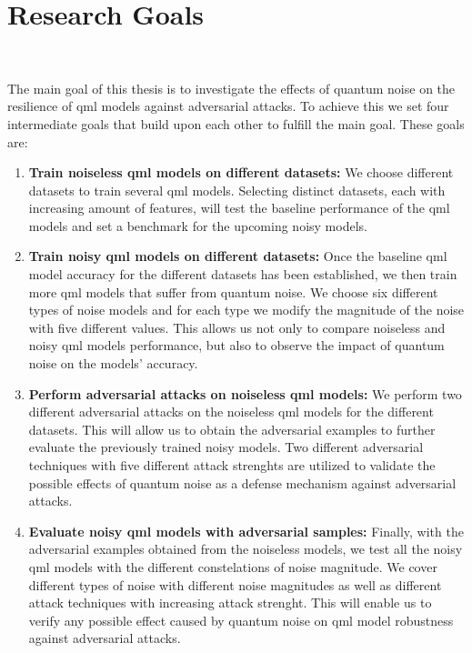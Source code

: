 \section{Research Goals}\label{section:research_goals} \

The main goal of this thesis is to investigate the effects of quantum noise
on the resilience of \ac{qml} models against adversarial
attacks. To achieve this we set four intermediate goals that build
upon each other to fulfill the main goal. These goals are: \

\begin{enumerate}
    \item \textbf{Train noiseless \ac{qml} models on different datasets:}
            We choose different datasets to train several \ac{qml} models.
            Selecting distinct datasets, each with increasing amount of
            features, will test the baseline performance of the \ac{qml}
            models and set a benchmark for the upcoming noisy models. \
    \item \textbf{Train noisy \ac{qml} models on different datasets:} Once
            the baseline \ac{qml} model accuracy for the different datasets
            has been established, we then train more \ac{qml} models that
            suffer from quantum noise. We choose six different types of
            noise models and for each type we modify the magnitude of the
            noise with five different values. This allows us not only
            to compare noiseless and noisy \ac{qml} models performance,
            but also to observe the impact of quantum noise on the models'
            accuracy. \
    \item \textbf{Perform adversarial attacks on noiseless \ac{qml} models:}
            We perform two different adversarial attacks on the noiseless
            \ac{qml} models for the different datasets. This will allow
            us to obtain the adversarial examples to further evaluate the
            previously trained noisy models. Two different adversarial
            techniques with five different attack strenghts are utilized
            to validate the possible effects of quantum noise as a defense
            mechanism against adversarial attacks. \
    \item \textbf{Evaluate noisy \ac{qml} models with adversarial samples:}
            Finally, with the adversarial examples obtained from the noiseless
            models, we test all the noisy \ac{qml} models with the different
            constelations of noise magnitude. We cover different types of noise
            with different noise magnitudes as well as different attack techniques
            with increasing attack strenght. This will enable us to verify
            any possible effect caused by quantum noise on \ac{qml} model robustness
            against adversarial attacks. \
\end{enumerate} \

